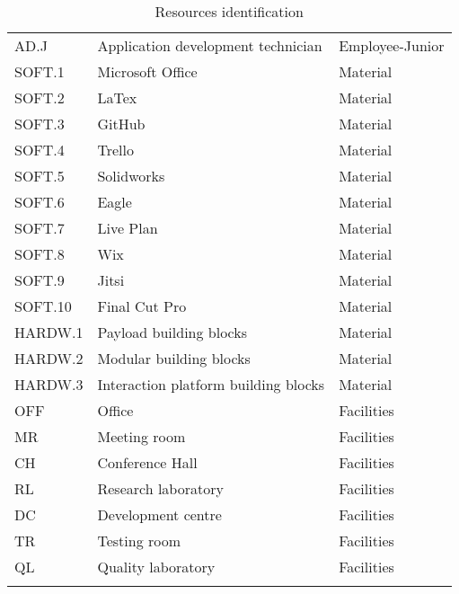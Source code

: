 \begin{longtable}{lll}
AD.J&Application development technician&Employee-Junior\\
SOFT.1&Microsoft Office&Material\\
SOFT.2&LaTex&Material\\
SOFT.3&GitHub&Material\\
SOFT.4&Trello&Material\\
SOFT.5&Solidworks&Material\\
SOFT.6&Eagle&Material\\
SOFT.7&Live Plan&Material\\
SOFT.8&Wix&Material\\
SOFT.9&Jitsi&Material\\
SOFT.10&Final Cut Pro&Material\\
HARDW.1&Payload building blocks&Material\\
HARDW.2&Modular building blocks&Material\\
HARDW.3& Interaction platform building blocks&Material\\
OFF& Office & Facilities\\
MR& Meeting room& Facilities\\
CH& Conference Hall& Facilities\\
RL & Research laboratory & Facilities\\
DC & Development centre & Facilities\\
TR& Testing room & Facilities\\
QL& Quality laboratory& Facilities\\


\bottomrule[2pt]

\caption{Resources identification}
\label{table_resourcesidentification}	
\end{longtable}


